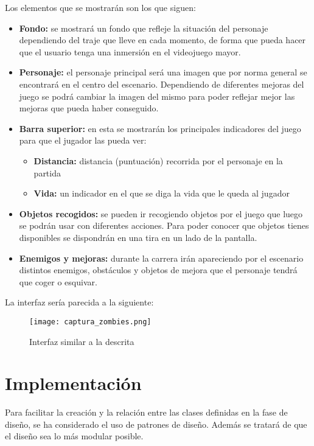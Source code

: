 \documentclass[palatino]{apuntes}
\begin{document}
Los elementos que se mostrarán son los que siguen:
\begin{itemize}
	\item \textbf{Fondo:} se mostrará un fondo que refleje la situación del personaje dependiendo del traje que lleve en cada momento, de forma que pueda hacer que el usuario tenga una inmersión en el videojuego mayor.
	\item \textbf{Personaje:} el personaje principal será una imagen que por norma general se encontrará en el centro del escenario. Dependiendo de diferentes mejoras del juego se podrá cambiar la imagen del mismo para poder reflejar mejor las mejoras que pueda haber conseguido.
	\item \textbf{Barra superior:} en esta se mostrarán los principales indicadores del juego para que el jugador las pueda ver:
		\begin{itemize}
			\item \textbf{Distancia:} distancia (puntuación) recorrida por el personaje en la partida
			\item \textbf{Vida:} un indicador en el que se diga la vida que le queda al jugador
		\end{itemize}
	\item \textbf{Objetos recogidos:} se pueden ir recogiendo objetos por el juego que luego se podrán usar con diferentes acciones. Para poder conocer que objetos tienes disponibles se dispondrán en una tira en un lado de la pantalla.
	
	\item \textbf{Enemigos y mejoras:} durante la carrera irán apareciendo por el escenario distintos enemigos, obstáculos y objetos de mejora que el personaje tendrá que coger o esquivar.
\end{itemize}

La interfaz sería parecida a la siguiente:

\begin{figure}[hbtp]
    \centering
    \texttt{[image: captura\_zombies.png]}
    \caption{Interfaz similar a la descrita}
    \label{fig:interfazzombie}
\end{figure}


\chapter{Implementación}
Para facilitar la creación y la relación entre las clases definidas en la fase de diseño, se ha considerado el uso de patrones de diseño. Además se tratará de que el diseño sea lo más modular posible.
\end{document}
